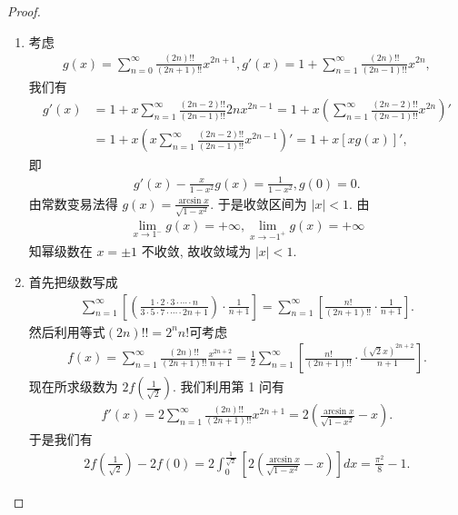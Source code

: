 \documentclass[../../main.tex]{subfiles}
\begin{document}
\begin{proof}
\begin{enumerate}
\item 考虑
\begin{align*}
g(x) = \sum_{n=0}^{\infty} \frac{(2n)!!}{(2n + 1)!!} x^{2n + 1}, g'(x) = 1 + \sum_{n=1}^{\infty} \frac{(2n)!!}{(2n - 1)!!} x^{2n},
\end{align*}
我们有
\begin{align*}
g'(x) &= 1 + x \sum_{n=1}^{\infty} \frac{(2n - 2)!!}{(2n - 1)!!} 2n x^{2n - 1} = 1 + x \left( \sum_{n=1}^{\infty} \frac{(2n - 2)!!}{(2n - 1)!!} x^{2n} \right)' \\
&= 1 + x \left( x \sum_{n=1}^{\infty} \frac{(2n - 2)!!}{(2n - 1)!!} x^{2n - 1} \right)' = 1 + x [x g(x)]',
\end{align*}
即
\begin{align*}
g'(x) - \frac{x}{1 - x^2} g(x) = \frac{1}{1 - x^2}, g(0) = 0.
\end{align*}
由常数变易法得 $g(x) = \frac{\arcsin x}{\sqrt{1 - x^2}}$. 于是收敛区间为 $|x| < 1$. 由
\begin{align*}
\lim_{x \to 1^-} g(x) = +\infty, \lim_{x \to -1^+} g(x) = +\infty
\end{align*}
知幂级数在 $x = \pm 1$ 不收敛, 故收敛域为 $|x| < 1$.
\item 首先把级数写成
\begin{align*}
\sum_{n=1}^{\infty} \left[ \left( \frac{1 \cdot 2 \cdot 3 \cdot \cdots \cdot n}{3 \cdot 5 \cdot 7 \cdot \cdots \cdot 2n + 1} \right) \cdot \frac{1}{n + 1} \right] = \sum_{n=1}^{\infty} \left[ \frac{n!}{(2n + 1)!!} \cdot \frac{1}{n + 1} \right].
\end{align*}
然后利用等式$(2n)!!=2^nn!$可考虑
\begin{align*}
f(x) = \sum_{n=1}^{\infty} \frac{(2n)!!}{(2n + 1)!!} \frac{x^{2n + 2}}{n + 1} = \frac{1}{2} \sum_{n=1}^{\infty} \left[ \frac{n!}{(2n + 1)!!} \cdot \frac{(\sqrt{2}x)^{2n + 2}}{n + 1} \right].
\end{align*}
现在所求级数为 $2f\left( \frac{1}{\sqrt{2}} \right)$.
我们利用第 1 问有
\begin{align*}
f'(x) = 2 \sum_{n=1}^{\infty} \frac{(2n)!!}{(2n + 1)!!} x^{2n + 1} = 2 \left( \frac{\arcsin x}{\sqrt{1 - x^2}} - x \right).
\end{align*}
于是我们有
\begin{align*}
2f\left( \frac{1}{\sqrt{2}} \right) - 2f(0) = 2 \int_0^{\frac{1}{\sqrt{2}}} \left[ 2 \left( \frac{\arcsin x}{\sqrt{1 - x^2}} - x \right) \right] dx = \frac{\pi^2}{8} - 1.
\end{align*}
\end{enumerate}
\end{proof}
\end{document}
